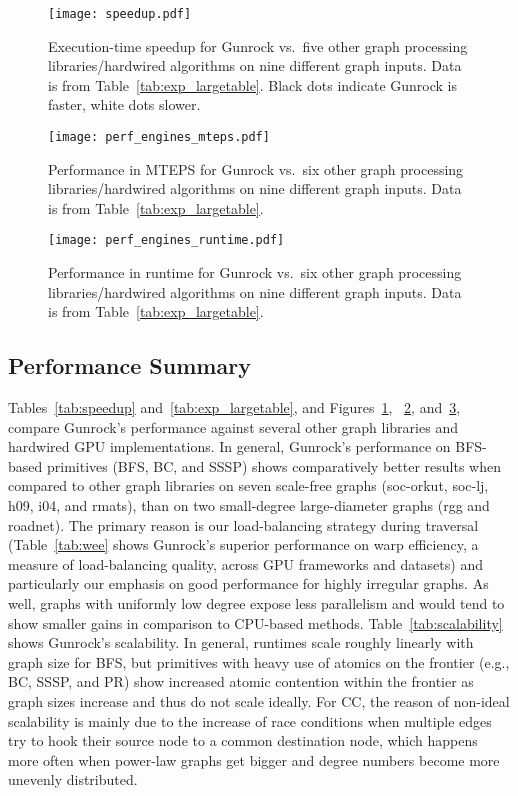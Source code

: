 \documentclass[format=acmsmall,review=false,screen=true]{acmart}
\begin{document}
\begin{figure}
    \centering
    \texttt{[image: speedup.pdf]}
    \centering
    \caption[Speedup for Gunrock.]{Execution-time speedup for Gunrock
      vs.\ five other graph processing libraries/hardwired algorithms
      on nine different graph inputs. Data is from
      Table~\ref{tab:exp_largetable}. Black dots indicate Gunrock is
      faster, white dots slower.\label{fig:speedup}}
\end{figure}

\begin{figure}
    \centering
    \texttt{[image: perf\_engines\_mteps.pdf]}
    \centering
    \caption[MTEPS comparison for Gunrock and others.]{Performance in
      MTEPS for Gunrock vs.\ six other graph processing
      libraries/hardwired algorithms on nine different graph inputs.
      Data is from Table~\ref{tab:exp_largetable}.\label{fig:mteps}}
\end{figure}

\begin{figure}
    \centering
    \texttt{[image: perf\_engines\_runtime.pdf]}
    \centering
    \caption[Runtime comparison for Gunrock and others.]{Performance
      in runtime for Gunrock vs.\ six other graph processing
      libraries/hardwired algorithms on nine different graph inputs.
      Data is from Table~\ref{tab:exp_largetable}.\label{fig:runtime}}
\end{figure}

\subsection{Performance Summary}
Tables~\ref{tab:speedup} and~\ref{tab:exp_largetable}, and
Figures~\ref{fig:speedup}, ~\ref{fig:mteps}, and~\ref{fig:runtime},
compare Gunrock's performance against several other graph libraries
and hardwired GPU implementations. In general, Gunrock's performance
on BFS-based primitives (BFS, BC, and SSSP) shows comparatively better
results when compared to other graph libraries on seven scale-free
graphs (soc-orkut, soc-lj, h09, i04, and rmats), than on two
small-degree large-diameter graphs (rgg and roadnet). The primary
reason is our load-balancing strategy during traversal
(Table~\ref{tab:wee} shows Gunrock's superior performance on warp
efficiency, a measure of load-balancing quality, across GPU frameworks
and datasets) and particularly our emphasis on good performance for
highly irregular graphs. As well, graphs with uniformly low degree
expose less parallelism and would tend to show smaller gains in
comparison to CPU-based methods. Table~\ref{tab:scalability} shows
Gunrock's scalability. In general, runtimes scale roughly linearly
with graph size for BFS, but primitives with heavy use of atomics on
the frontier (e.g., BC, SSSP, and PR) show increased atomic contention
within the frontier as graph sizes increase and thus do not scale
ideally. For CC, the reason of non-ideal scalability is mainly due to
the increase of race conditions when multiple edges try to hook their
source node to a common destination node, which happens more often
when power-law graphs get bigger and degree numbers become more
unevenly distributed.
\end{document}
